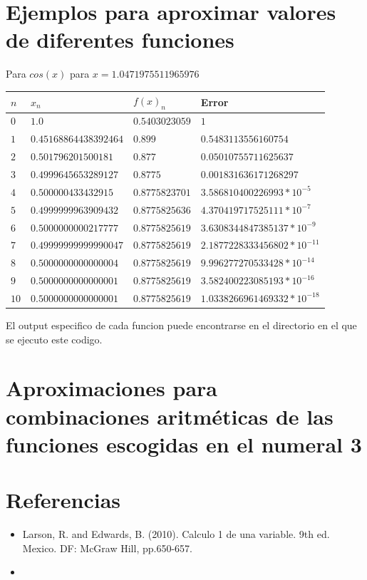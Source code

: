 \documentclass[12pt]{article}
\begin{document}
    \section {Ejemplos para aproximar valores de diferentes funciones}
    Para $cos(x)$ para $x = 1.0471975511965976$
        \begin{center}
            \begin{tabular}{|l|l|l|l|} \hline
            $n$ & $x_{n}$ & $f(x)_{n}$ & Error \\
            \hline \hline
            $0$ & $1.0$ &  $0.5403023059$ & $1$    \\
            \hline 
            $1$ & $0.45168864438392464$ & $0.899$ & $0.5483113556160754$\\
            \hline 
            $2$ & $0.501796201500181$ & $0.877$ & $0.05010755711625637$\\
            \hline 
            $3$ & $0.4999645653289127$ & $0.8775$ & $0.001831636171268297$\\
            \hline 
            $4$ & $0.500000433432915$ & $0.8775823701$ & $3.586810400226993 * 10^{-5}$\\
            \hline 
            $5$ & $0.4999999963909432$ & $0.8775825636$ & $4.370419717525111 * 10^{-7}$\\
            \hline 
            $6$ & $0.5000000000217777$ & $0.8775825619$ & $ 3.6308344847385137 * 10^{-9}$\\
            \hline 
            $7$ & $0.49999999999990047$ & $0.8775825619$ & $2.1877228333456802 * 10^{-11}$\\
            \hline 
            $8$ & $0.5000000000000004$ & $0.8775825619$ & $9.996277270533428 * 10^{-14}$\\
            \hline 
            $9$ & $0.5000000000000001$ & $0.8775825619$ & $3.582400223085193 * 10^{-16}$\\
            \hline 
            $10$ & $0.5000000000000001$ & $0.8775825619$ & $1.0338266961469332 * 10^{-18}$\\
            \hline
            \end{tabular}
        \end{center}


    El output especifico de cada funcion puede encontrarse en el directorio en el que se ejecuto este codigo.


        \section {Aproximaciones para combinaciones aritméticas de las funciones escogidas en el numeral 3}

        \section {Referencias}

        \begin{itemize}
        \item{Larson, R. and Edwards, B. (2010). Calculo 1 de una variable. 9th ed. Mexico. DF: McGraw Hill, pp.650-657.}
        \item{}
        \end{itemize}
\end{document}
